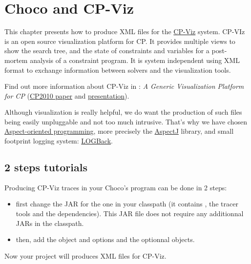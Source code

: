 \label{chocoandcpviz}
\hypertarget{chocoandcpviz}{}

\chapter{Choco and CP-Viz}\label{chocoandcpviz:chocoandcpviz}\hypertarget{chocoandcpviz:chocoandcpviz}{}

This chapter presents how to produce XML files for the \href{http://sourceforge.net/projects/cpviz/}{{CP-Viz}} system. CP-VIz is an open source visualization platform for CP. It provides multiple views to show the search tree, and the state of constraints and variables for a post- mortem analysis of a constraint program. It is system independent using XML format to exchange information between solvers and the visualization tools.

\medskip
Find out more information about CP-Viz in  \cite{Simonis10}: \emph{A Generic Visualization Platform for CP} (\href{http://www.4c.ucc.ie/~hsimonis/cpviz-cp2010-paper.pdf}{{CP2010 paper}} and \href{http://www.4c.ucc.ie/~hsimonis/cpviz-cp2010-slides.pdf}{{presentation}}).

\medskip
Although visualization is really helpful, we do want the production of such files being easily unpluggable and not too much intrusive. That's why we have chosen \href{http://en.wikipedia.org/wiki/Aspect-oriented_programming}{{Aspect-oriented programming}}, more precisely the \href{http://www.eclipse.org/aspectj/}{{AspectJ}} library, and small footprint logging system: \href{http://logback.qos.ch/}{{LOGBack}}. 

\section{2 steps tutorials}\label{chocoandcpviz:2stepstuto}\hypertarget{chocoandcpviz:2stepstuto}{}

Producing CP-Viz traces in your Choco's program can be done in 2 steps:

\begin{itemize}
\item first change the  JAR for the  one in your classpath (it contains , the tracer tools and the dependencies). This JAR file does not require any additionnal JARs in the classpath.
\item then, add the  object and options and the optionnal  objects.
\end{itemize}
Now your project will produces XML files for CP-Viz.
\medskip


